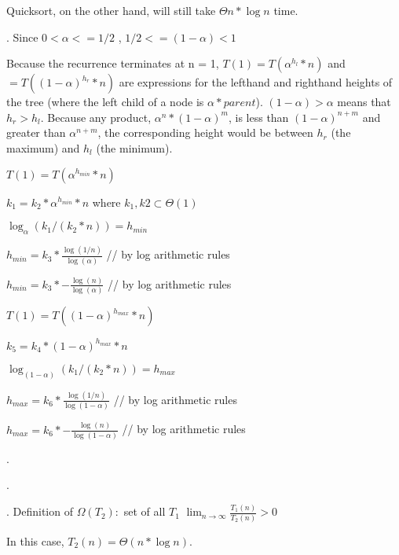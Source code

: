 \documentclass[12pt]{article}
\newcommand{\BigOmega}{\ensuremath{\Omega}}
\begin{document}
Quicksort, on the other hand, will still take $\Theta{n * \log{n}}$ time.


\vspace{10mm}
\noindent {}.
Since $ 0 < \alpha <= 1/2   $ , $1/2 <= (1 - \alpha) < 1 $

Because the recurrence terminates at n = 1, $ T(1) = T(\alpha^{h_{l}} * n) $ and $= T((1 - \alpha)^{h_{r}} * n) $ are expressions for the lefthand and righthand heights of the tree (where the left child of a node is $\alpha * parent$).  $ (1 - \alpha) > \alpha $ means that $ h_{r} > h_{l} $. Because any product, $\alpha^{n} * (1 - \alpha)^{m} $, is less than $(1- \alpha)^{n+m} $ and greater than $ \alpha^{n+m} $, the corresponding height would be between $h_{r}$ (the maximum) and $h_{l}$ (the minimum). 

$ T(1) = T(\alpha^{h_{min}} * n) $

$ k_{1} = k_{2} * \alpha^{h_{min}} * n $  where $ k_{1},k{2} \subset \Theta(1)$

$ \log_{\alpha}(k_{1} / (k_{2} * n)) = h_{min}  $

$ h_{min} = k_{3} * \frac{\log(1/n)} {\log(\alpha)} $ // by log arithmetic rules

$ h_{min} = k_{3} * - \frac{\log(n)} {\log(\alpha)} $ // by log arithmetic rules

\vspace{10 mm}
$ T(1) = T((1 - \alpha)^{h_{max}} * n) $

$ k_{5} = k_{4} * (1 - \alpha)^{h_{max}} * n $

$ \log_{(1 - \alpha)}(k_{1} / (k_{2} * n)) = h_{max}  $

$ h_{max} = k_{6} * \frac{\log(1/n)}{\log(1 - \alpha)}$ // by log arithmetic rules

$ h_{max} = k_{6} * - \frac{\log(n)} {\log(1 - \alpha)}  $ // by log arithmetic rules

\vspace{10mm}
\noindent {}.

\vspace{10mm}
\noindent {}.

\vspace{10mm}
\noindent {}.
Definition of $\BigOmega(T_{2}): $ set of all $T_{1}$ $\lim_{n \to \infty} \frac{T_{1}(n)}{T_{2}(n)} > 0 $

In this case, $T_{2}(n) = \Theta(n * \log n) $.
\end{document}
